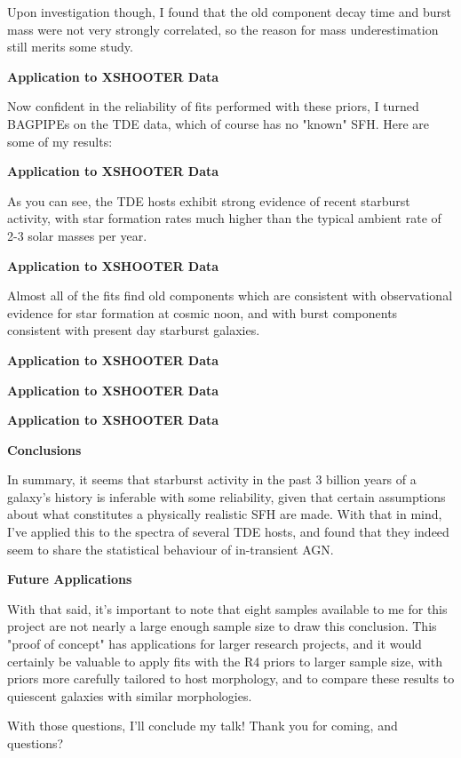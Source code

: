 \documentclass[a4paper,11pt]{article}
\begin{document}
\noindent \newline Upon investigation though, I found that the old component decay time and burst
mass were not very strongly correlated, so the reason for mass underestimation
still merits some study.

\noindent \newline \textbf{Application to XSHOOTER Data}

\noindent \newline Now confident in the reliability of fits performed with these priors, I turned
BAGPIPEs on the TDE data, which of course has no "known" SFH. Here are some of
my results:

\noindent \newline \textbf{Application to XSHOOTER Data}

\noindent \newline As you can see, the TDE hosts exhibit strong evidence of recent starburst activity,
with star formation rates much higher than the typical ambient rate of 2-3 solar
masses per year.

\noindent \newline \textbf{Application to XSHOOTER Data}

\noindent \newline Almost all of the fits find old components which are consistent with observational
evidence for star formation at cosmic noon, and with burst components consistent
with present day starburst galaxies.

\noindent \newline \textbf{Application to XSHOOTER Data}

\noindent \newline \textbf{Application to XSHOOTER Data}

\noindent \newline \textbf{Application to XSHOOTER Data}

\noindent \newline \textbf{Conclusions}

\noindent \newline In summary, it seems that starburst activity in the past 3 billion years of a
galaxy's history is inferable with some reliability, given that certain assumptions
about what constitutes a physically realistic SFH are made. With that in mind, I've
applied this to the spectra of several TDE hosts, and found that they indeed
seem to share the statistical behaviour of in-transient AGN.

\noindent \newline \textbf{Future Applications}

\noindent \newline With that said, it's important to note that eight samples available to me for
this project are not nearly a large enough sample size to draw this conclusion.
This "proof of concept" has applications for larger research projects, and it
would certainly be valuable to apply fits with the R4 priors to larger sample
size, with priors more carefully tailored to host morphology, and to compare
these results to quiescent galaxies with similar morphologies.

\noindent \newline With those questions, I'll conclude my talk! Thank you for coming, and questions?
\end{document}
